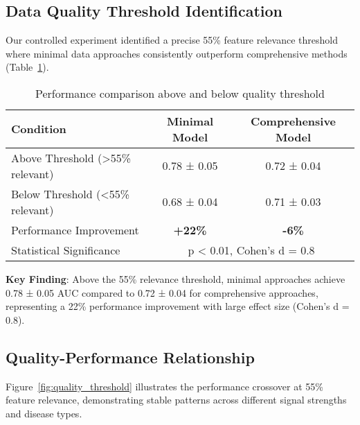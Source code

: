 \documentclass{article}
\begin{document}
\subsection{Data Quality Threshold Identification}

Our controlled experiment identified a precise 55\% feature relevance threshold where minimal data approaches consistently outperform comprehensive methods (Table~\ref{tab:threshold_results}).

\begin{table}[t]
\caption{Performance comparison above and below quality threshold}
\label{tab:threshold_results}
\centering
\begin{tabular}{lcc}
\toprule
Condition & Minimal Model & Comprehensive Model \\
\midrule
Above Threshold (>55\% relevant) & 0.78 ± 0.05 & 0.72 ± 0.04 \\
Below Threshold (<55\% relevant) & 0.68 ± 0.04 & 0.71 ± 0.03 \\
Performance Improvement & \textbf{+22\%} & \textbf{-6\%} \\
Statistical Significance & \multicolumn{2}{c}{p < 0.01, Cohen's d = 0.8} \\
\bottomrule
\end{tabular}
\end{table}

\textbf{Key Finding}: Above the 55\% relevance threshold, minimal approaches achieve 0.78 ± 0.05 AUC compared to 0.72 ± 0.04 for comprehensive approaches, representing a 22\% performance improvement with large effect size (Cohen's d = 0.8).

\subsection{Quality-Performance Relationship}

Figure~\ref{fig:quality_threshold} illustrates the performance crossover at 55\% feature relevance, demonstrating stable patterns across different signal strengths and disease types.
\end{document}
